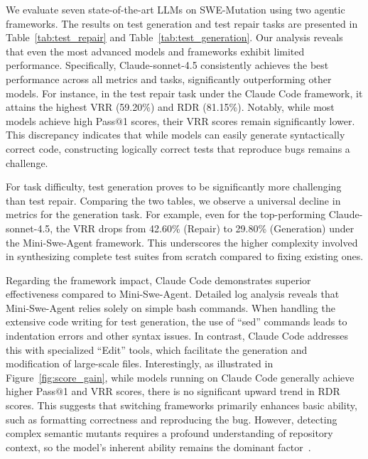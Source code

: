 \documentclass[11pt]{article}
\begin{document}
We evaluate seven state-of-the-art LLMs on SWE-Mutation using two agentic frameworks. The results on test generation and test repair tasks are presented in Table~\ref{tab:test_repair} and Table~\ref{tab:test_generation}. Our analysis reveals that even the most advanced models and frameworks exhibit limited performance. Specifically, Claude-sonnet-4.5 consistently achieves the best performance across all metrics and tasks, significantly outperforming other models. For instance, in the test repair task under the Claude Code framework, it attains the highest VRR (59.20\%) and RDR (81.15\%). Notably, while most models achieve high Pass$@$1 scores, their VRR scores remain significantly lower. This discrepancy indicates that while models can easily generate syntactically correct code, constructing logically correct tests that reproduce bugs remains a challenge.

For task difficulty, test generation proves to be significantly more challenging than test repair. Comparing the two tables, we observe a universal decline in metrics for the generation task. For example, even for the top-performing Claude-sonnet-4.5, the VRR drops from 42.60\% (Repair) to 29.80\% (Generation) under the Mini-Swe-Agent framework. This underscores the higher complexity involved in synthesizing complete test suites from scratch compared to fixing existing ones.

Regarding the framework impact, Claude Code demonstrates superior effectiveness compared to Mini-Swe-Agent. Detailed log analysis reveals that Mini-Swe-Agent relies solely on simple bash commands. When handling the extensive code writing for test generation, the use of ``sed'' commands leads to indentation errors and other syntax issues. In contrast, Claude Code addresses this with specialized ``Edit'' tools, which facilitate the generation and modification of large-scale files. Interestingly, as illustrated in Figure~\ref{fig:score_gain}, while models running on Claude Code generally achieve higher Pass$@$1 and VRR scores, there is no significant upward trend in RDR scores. This suggests that switching frameworks primarily enhances basic ability, such as formatting correctness and reproducing the bug. However, detecting complex semantic mutants requires a profound understanding of repository context, so the model's inherent ability remains the dominant factor~\citep{zhao2025unveiling}.
\end{document}
